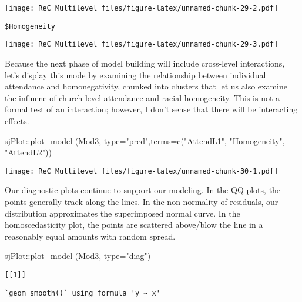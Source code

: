 \documentclass[
  11pt,
]{book}
\newenvironment{Shaded}{\begin{snugshade}}{\end{snugshade}}
\newcommand{\AttributeTok}[1]{\textcolor[rgb]{0.77,0.63,0.00}{#1}}
\newcommand{\FunctionTok}[1]{\textcolor[rgb]{0.00,0.00,0.00}{#1}}
\newcommand{\NormalTok}[1]{#1}
\newcommand{\SpecialCharTok}[1]{\textcolor[rgb]{0.00,0.00,0.00}{#1}}
\newcommand{\StringTok}[1]{\textcolor[rgb]{0.31,0.60,0.02}{#1}}
\begin{document}
\texttt{[image: ReC\_Multilevel\_files/figure-latex/unnamed-chunk-29-2.pdf]}

\begin{verbatim}
$Homogeneity
\end{verbatim}

\texttt{[image: ReC\_Multilevel\_files/figure-latex/unnamed-chunk-29-3.pdf]}

Because the next phase of model building will include cross-level interactions, let's display this mode by examining the relationship between individual attendance and homonegativity, chunked into clusters that let us also examine the influene of church-level attendance and racial homogeneity. This is not a formal test of an interaction; however, I don't sense that there will be interacting effects.

\begin{Shaded}
\begin{Highlighting}[]
\NormalTok{sjPlot}\SpecialCharTok{::}\FunctionTok{plot\_model}\NormalTok{ (Mod3, }\AttributeTok{type=}\StringTok{"pred"}\NormalTok{,}\AttributeTok{terms=}\FunctionTok{c}\NormalTok{(}\StringTok{"AttendL1"}\NormalTok{, }\StringTok{"Homogeneity"}\NormalTok{, }\StringTok{"AttendL2"}\NormalTok{))}
\end{Highlighting}
\end{Shaded}

\texttt{[image: ReC\_Multilevel\_files/figure-latex/unnamed-chunk-30-1.pdf]}

Our diagnostic plots continue to support our modeling. In the QQ plots, the points generally track along the lines. In the non-normality of residuals, our distribution approximates the superimposed normal curve. In the homoscedasticity plot, the points are scattered above/blow the line in a reasonably equal amounts with random spread.

\begin{Shaded}
\begin{Highlighting}[]
\NormalTok{sjPlot}\SpecialCharTok{::}\FunctionTok{plot\_model}\NormalTok{ (Mod3, }\AttributeTok{type=}\StringTok{"diag"}\NormalTok{)}
\end{Highlighting}
\end{Shaded}

\begin{verbatim}
[[1]]
\end{verbatim}

\begin{verbatim}
`geom_smooth()` using formula 'y ~ x'
\end{verbatim}
\end{document}
